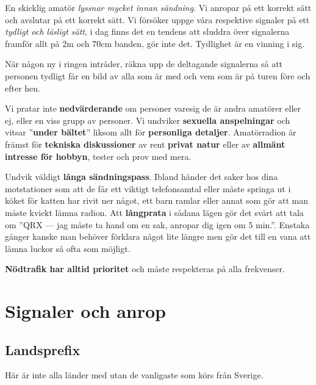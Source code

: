 En skicklig amatör \textit{lyssnar mycket innan sändning}. Vi anropar på ett
korrekt sätt och avslutar på ett korrekt sätt. Vi försöker uppge våra respektive
signaler på ett \emph{tydligt och läsligt sätt}, i dag finns det en tendens att
sluddra över signalerna framför allt på 2m och 70cm banden, gör inte
det. Tydlighet är en vinning i sig.

När någon ny i ringen inträder, räkna upp de deltagande signalerna så att
personen tydligt får en bild av alla som är med och vem som är på turen före och
efter hen.

Vi pratar inte \textbf{nedvärderande} om personer varesig de är andra amatörer
eller ej, eller en viss grupp av personer. Vi undviker \textbf{sexuella
  anspelningar} och vitsar ''\textbf{under bältet}'' liksom allt för
\textbf{personliga detaljer}. Amatörradion är främst
för \textbf{tekniska diskussioner} av rent \textbf{privat natur} eller
av \textbf{allmänt intresse för hobbyn}, tester och prov med mera.

Undvik väldigt \textbf{långa sändningspass}. Ibland händer det saker hos dina
motstationer som att de får ett viktigt telefonsamtal eller måste springa ut i
köket för katten har rivit ner något, ett barn ramlar eller annat som gör att
man måste kvickt lämna radion. Att \textbf{långprata} i sådana lägen gör det
svårt att tala om ''QRX --- jag måste ta hand om en sak, anropar dig igen om 5
min.''. Enstaka gånger kanske man behöver förklara något lite längre men gör det
till en vana att lämna luckor så ofta som möjligt.

\textbf{Nödtrafik har alltid prioritet} och måste respekteras på alla
frekvenser.

\section{Signaler och anrop}

\subsection{Landsprefix}

Här är inte alla länder med utan de vanligaste som körs från Sverige.


